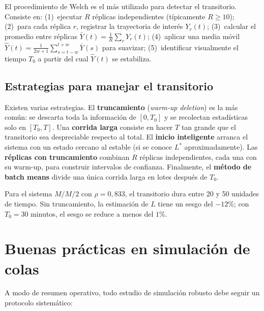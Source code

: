 \documentclass[11pt, letterpaper]{article}
\begin{document}
El procedimiento de Welch es el más utilizado para detectar el transitorio. Consiste en: (1)~ejecutar $R$ réplicas independientes (típicamente $R \geq 10$); (2)~para cada réplica $r$, registrar la trayectoria de interés $Y_r(t)$; (3)~calcular el promedio entre réplicas $\bar{Y}(t) = \frac{1}{R}\sum_r Y_r(t)$; (4)~aplicar una media móvil $\hat{Y}(t) = \frac{1}{2w+1}\sum_{s=t-w}^{t+w}\bar{Y}(s)$ para suavizar; (5)~identificar visualmente el tiempo $T_0$ a partir del cual $\hat{Y}(t)$ se estabiliza.

\subsection{Estrategias para manejar el transitorio}

Existen varias estrategias. El \textbf{truncamiento} (\emph{warm-up deletion}) es la más común: se descarta toda la información de $[0, T_0]$ y se recolectan estadísticas solo en $[T_0, T]$. Una \textbf{corrida larga} consiste en hacer $T$ tan grande que el transitorio sea despreciable respecto al total. El \textbf{inicio inteligente} arranca el sistema con un estado cercano al estable (si se conoce $L^*$ aproximadamente). Las \textbf{réplicas con truncamiento} combinan $R$ réplicas independientes, cada una con su warm-up, para construir intervalos de confianza. Finalmente, el \textbf{método de batch means} divide una única corrida larga en lotes después de $T_0$.

Para el sistema $M/M/2$ con $\rho = 0{,}833$, el transitorio dura entre 20 y 50 unidades de tiempo. Sin truncamiento, la estimación de $L$ tiene un sesgo del $-12\%$; con $T_0 = 30$ minutos, el sesgo se reduce a menos del $1\%$.


\section{Buenas prácticas en simulación de colas}

A modo de resumen operativo, todo estudio de simulación robusto debe seguir un protocolo sistemático:
\end{document}
